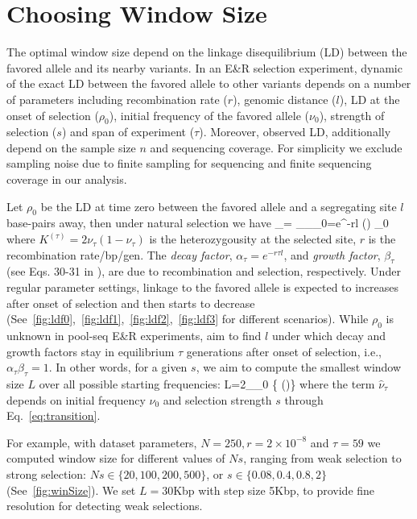 \section{Choosing Window Size}\label{sec:winSize}
The optimal window size depend on the linkage disequilibrium (LD) between the 
favored allele and its nearby variants. 
In an E\&R selection experiment, dynamic of the exact LD between the favored 
allele to other variants depends on a number of parameters  including 
recombination rate ($r$), genomic distance ($l$), LD at the onset of selection 
($\rho_0$), initial frequency of the favored allele ($\nu_0$), strength of 
selection ($s$) and span of 
experiment ($\tau$). Moreover, observed LD, additionally depend on  the sample 
size $n$ and sequencing coverage. For simplicity we exclude sampling noise due 
to finite sampling for sequencing and finite sequencing coverage in our 
analysis.


Let $\rho_0$ be the LD at time zero between the favored allele and a 
segregating site $l$ base-pairs away, then under natural selection we have
\beq
\rho_\tau= \alpha_\tau\beta_\tau \rho_0=e^{-r\tau l} 
\left(\right)  
\rho_0\label{eq:ldt}
\eeq
where $K^{(\tau)}=2\nu_\tau(1-\nu_\tau)$ is the heterozygousity at the 
selected 
site, $r$ is 
the recombination rate/bp/gen. The 
\emph{decay factor}, $\alpha_\tau=e^{-r\tau l}$,
and \emph{growth factor}, $\beta_\tau$ (see Eqs. 30-31 in 
\cite{stephan2006hitchhiking}), are due to recombination and 
selection, respectively.  
Under regular parameter settings, linkage to the favored allele is 
expected to 
increases after 
onset of selection and then starts to decrease 
(See~\ref{fig:ldf0},~\ref{fig:ldf1},~\ref{fig:ldf2},~\ref{fig:ldf3} for 
different scenarios).
While $\rho_0$ is unknown in 
pool-seq E\&R experiments, aim to find $l$ under which decay and growth factors
stay in equilibrium $\tau$ generations after onset of selection, i.e., 
$\alpha_\tau \beta_\tau=1$. In other words, for a given 
$s$, we aim to compute the smallest window size $L$ over all possible 
starting 
frequencies:
\beq 
L=2\min_{\nu_0} \left\{ 
\log\left(\right)\right\}
\eeq
where the term $\hat{\nu}_\tau$ depends on initial 
frequency $\nu_0$ and selection strength $s$ through 
Eq.~\ref{eq:transition}.


For example, with \dmel dataset parameters, $N=250,r=2\times10^{-8}$ 
and 
$\tau=59$ we computed window size for different values of $Ns$, ranging 
from 
weak selection to strong selection: $Ns\in\{20,100,200,500\}$, or 
$s\in\{0.08,0.4,0.8,2\}$ (See~\ref{fig:winSize}). 
We set $L=30$Kbp with step size 5Kbp, to provide fine resolution for 
detecting 
weak selections.








